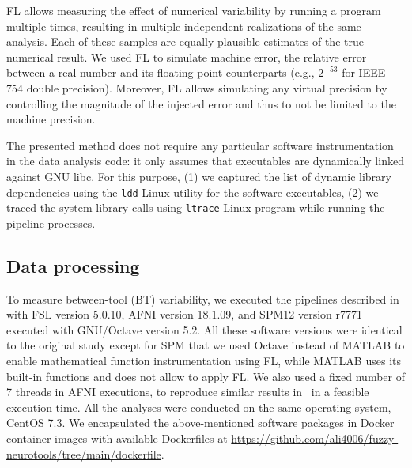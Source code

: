\documentclass[conference]{IEEEtran}
\begin{document}

%

FL allows measuring the effect of numerical variability by running a program multiple times, 
resulting in multiple independent realizations of the same analysis. Each of these samples 
are equally plausible estimates of the true numerical result. 
We used FL to simulate machine error, the relative error between a real number and its floating-point counterparts
(e.g., $2^{-53}$ for IEEE-754 double precision).
Moreover, FL allows simulating any virtual precision
by controlling the magnitude of the injected error and
thus to not be limited to the machine precision.

The presented method does not require any
particular software instrumentation in the data analysis code: it only
assumes that executables are dynamically linked against GNU libc. For this purpose,
(1) we captured the list of dynamic library dependencies using the \texttt{ldd} Linux utility for the software executables,
(2) we traced the system library calls using \texttt{ltrace} Linux program while running the pipeline processes.


\subsection{Data processing}

To measure between-tool (BT) variability, we executed the pipelines described in~\cite{bowring2019exploring}
with FSL version 5.0.10, AFNI version 18.1.09, and SPM12 version r7771
executed with GNU/Octave version 5.2.
All these software versions were identical to the original study except for SPM
that we used Octave instead of MATLAB to enable mathematical function instrumentation using FL,
while MATLAB uses its built-in functions and does not allow to apply FL.
We also used a fixed number of 7 threads in AFNI executions,
to reproduce similar results in~\cite{bowring2019exploring} in a feasible execution time.
All the analyses were conducted on the same operating system, CentOS 7.3.
We encapsulated the above-mentioned software packages in Docker container images with available Dockerfiles at \url{https://github.com/ali4006/fuzzy-neurotools/tree/main/dockerfile}.
\end{document}
